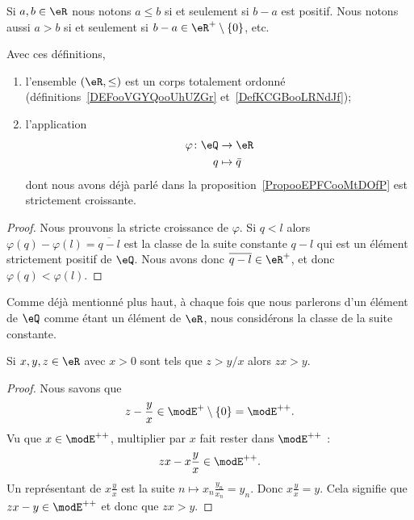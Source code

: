 \begin{lemmaDef}       \label{LemooRordonne}
    Si \( a,b\in \eR\) nous notons \( a\leq b\) si et seulement si \( b-a\) est positif. Nous notons aussi \( a>b\) si et seulement si \( b-a\in \eR^+\setminus\{ 0 \}\), etc.

    Avec ces définitions,
    \begin{enumerate}
        \item       \label{ITEMooNHIUooMQHZKZ}
            l'ensemble \( (\eR,\leq)\) est un corps totalement ordonné (définitions~\ref{DEFooVGYQooUhUZGr} et~\ref{DefKCGBooLRNdJf});
        \item
            l'application
            \begin{equation}
                \begin{aligned}
                    \varphi\colon \eQ&\to \eR \\
                    q&\mapsto \bar q
                \end{aligned}
            \end{equation}
            dont nous avons déjà parlé dans la proposition~\ref{PropooEPFCooMtDOfP} est strictement croissante.
    \end{enumerate}
\end{lemmaDef}

\begin{proof}
    Nous prouvons la stricte croissance de \( \varphi\). Si \( q< l\) alors \( \varphi(q)-\varphi(l)=\overline{ q-l }\) est la classe de la suite constante \( q-l\) qui est un élément strictement positif de \( \eQ\). Nous avons donc \( \overline{ q-l }\in \eR^+\), et donc \( \varphi(q)<\varphi(l)\).
\end{proof}

\begin{remark}
    Comme déjà mentionné plus haut, à chaque fois que nous parlerons d'un élément de \( \eQ\) comme étant un élément de \( \eR\), nous considérons la classe de la suite constante.
\end{remark}

\begin{lemma}       \label{LemooYNOVooOwoRwD}
    Si \( x,y,z\in \eR\) avec \( x>0\) sont tels que \( z>y/x\) alors \( zx>y\).
\end{lemma}

\begin{proof}
    Nous savons que
    \begin{equation}
        z-\frac{ y }{ x }\in \modE^+\setminus\{ 0 \}=\modE^{++}.
    \end{equation}
    Vu que \( x\in\modE^{++}\), multiplier par \( x\) fait rester dans \( \modE^{++}\) :
    \begin{equation}
        zx-x\frac{ y }{ x }\in \modE^{++}.
    \end{equation}
    Un représentant de \( x\frac{ y }{ x }\) est la suite \( n\mapsto x_n\frac{ y_n }{ x_n }=y_n\). Donc \( x\frac{ y }{ x }=y\). Cela signifie que \( zx-y\in\modE^{++}\) et donc que \( zx>y\).
\end{proof}

